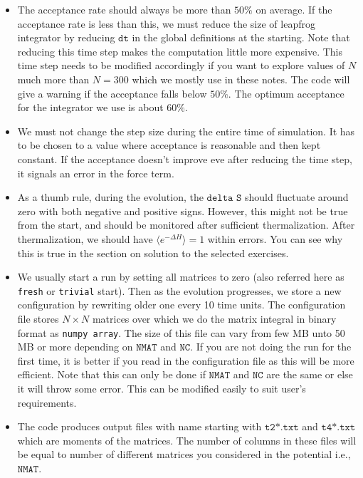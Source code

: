 \documentclass[11pt]{article}
\begin{document}
\begin{itemize} 
\item The acceptance rate should always be more than $50\%$
on average. If the acceptance rate is less than this, we
must reduce the size of leapfrog integrator by reducing 
$\texttt{dt}$ in the global definitions at the starting. Note that 
reducing this time step makes the computation little more expensive. 
This time step needs to be modified accordingly if you want to explore values of $N$
much more than $N = 300$ which we mostly use in these notes. The code will give a warning
if the acceptance falls below $50\%$. The optimum acceptance for the integrator we use is 
about $60\%$. 
\item We must not change the step size during the entire time of simulation. It has to be 
chosen to a value where acceptance is reasonable and then kept constant. If the acceptance
doesn't improve eve after reducing the time step, it signals an error in the force term.
\item As a thumb rule, during the evolution, the $\texttt{delta S}$ should fluctuate around zero
with both negative and positive signs. However, this might not be true from the start, and should
be monitored after sufficient thermalization. After thermalization, we should have 
$\langle e^{-\Delta H} \rangle = 1$ within errors. You can see why this is true in the section on 
solution to the selected exercises. 
\item We usually start a run by setting all matrices to zero (also referred here as \texttt{fresh} or \texttt{trivial} start). Then as the evolution progresses, we store a new configuration by rewriting older one
every 10 time units. The configuration file stores $N \times N$ matrices over which we do the matrix integral in binary format as \texttt{numpy array}. 
The size of this file can vary from few MB unto 50 MB or more depending on 
$\texttt{NMAT}$ and $\texttt{NC}$. If you are not doing the run for the first time, 
it is better if you read in the configuration file as this will be more efficient.  
Note that this can only be done if $\texttt{NMAT}$ and $\texttt{NC}$ are the same or else
it will throw some error. This can be modified easily to suit user's requirements. 
\item The code produces output files with name starting with $\texttt{t2*.txt}$ and $\texttt{t4*.txt}$
which are moments of the matrices. The number of columns in these files will be equal to 
number of different matrices you considered in the potential i.e., $\texttt{NMAT}$. 

\end{itemize}
\end{document}
